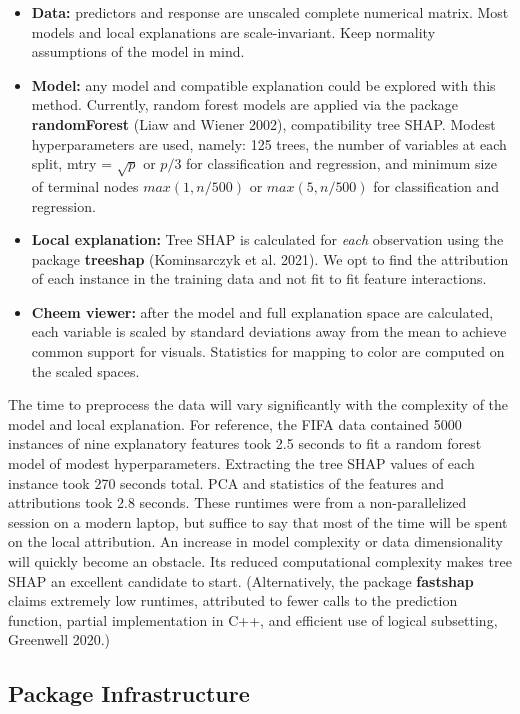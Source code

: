 \documentclass[11pt,twoside]{article}
\providecommand{\tightlist}{%
  \setlength{\itemsep}{0pt}\setlength{\parskip}{0pt}}
\begin{document}
\begin{itemize}
\tightlist
\item
  \textbf{Data:} predictors and response are unscaled complete numerical matrix. Most models and local explanations are scale-invariant. Keep normality assumptions of the model in mind.
\item
  \textbf{Model:} any model and compatible explanation could be explored with this method. Currently, random forest models are applied via the package \textbf{randomForest} (Liaw and Wiener 2002), compatibility tree SHAP. Modest hyperparameters are used, namely: 125 trees, the number of variables at each split, mtry = \(\sqrt{p}\) or \(p/3\) for classification and regression, and minimum size of terminal nodes \(max(1, n/500)\) or \(max(5, n/500)\) for classification and regression.
\item
  \textbf{Local explanation:} Tree SHAP is calculated for \emph{each} observation using the package \textbf{treeshap} (Kominsarczyk et al. 2021). We opt to find the attribution of each instance in the training data and not fit to fit feature interactions.
\item
  \textbf{Cheem viewer:} after the model and full explanation space are calculated, each variable is scaled by standard deviations away from the mean to achieve common support for visuals. Statistics for mapping to color are computed on the scaled spaces.
\end{itemize}

The time to preprocess the data will vary significantly with the complexity of the model and local explanation. For reference, the FIFA data contained 5000 instances of nine explanatory features took 2.5 seconds to fit a random forest model of modest hyperparameters. Extracting the tree SHAP values of each instance took 270 seconds total. PCA and statistics of the features and attributions took 2.8 seconds. These runtimes were from a non-parallelized session on a modern laptop, but suffice to say that most of the time will be spent on the local attribution. An increase in model complexity or data dimensionality will quickly become an obstacle. Its reduced computational complexity makes tree SHAP an excellent candidate to start. (Alternatively, the package \textbf{fastshap} claims extremely low runtimes, attributed to fewer calls to the prediction function, partial implementation in C++, and efficient use of logical subsetting, Greenwell 2020.)

\hypertarget{sec:infrastructure}{%
\subsection{Package Infrastructure}\label{sec:infrastructure}}
\end{document}
